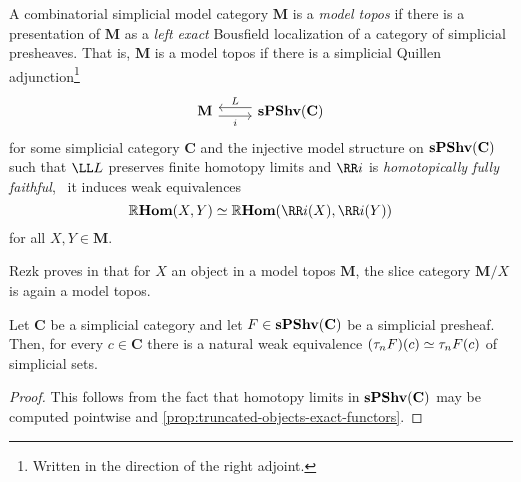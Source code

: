 \begin{definition}\label{defn:model-topos}
  A combinatorial simplicial model category \(\mathbf M\) is a
  \emph{model topos} if there is a presentation of \(\mathbf M\) as a
  \emph{left exact} Bousfield localization of a category of simplicial
  presheaves. That is, \(\mathbf M\) is a model topos if there is a
  simplicial Quillen adjunction\footnote{Written in the direction of
    the right adjoint.}
  \[
  \begin{tikzcd}
    \mathbf M \arrow[r, shift right=.7ex, "i"'] & \arrow[l, shift right=.7ex, "L"'] \spshv(\mathbf C)
  \end{tikzcd}
  \]
  for some simplicial category \(\mathbf C\) and the injective model
  structure on \(\operatorname{\textnormal{\bfseries sPShv}}(\mathbf C)\) such that \(\LL L\) preserves
  finite homotopy limits and \(\RR i\) is \emph{homotopically fully
    faithful}, \ie~it induces weak equivalences
  \[
  \RHom(X, Y)\simeq\RHom(\RR i(X), \RR i(Y))
  \]
  for all \(X,Y\in\mathbf M\).
\end{definition}

Rezk proves in \cite[Corollary~6.10]{rezkhomotopytoposes} that for
\(X\) an object in a model topos \(\mathbf M\), the slice category
\(\mathbf M/X\) is again a model topos.

\begin{lemma}\label{lem:trunc-presheaves}
  Let \(\mathbf C\) be a simplicial category and let
  \(F\in\operatorname{\textnormal{\bfseries sPShv}}(\mathbf C)\) be a simplicial presheaf. Then, for every
  \(c\in\mathbf C\) there is a natural weak equivalence
  \((\tau_{n}F)(c)\simeq \tau_{n}F(c)\) of simplicial sets.
\end{lemma}
\begin{proof}
  This follows from the fact that homotopy limits in \(\operatorname{\textnormal{\bfseries sPShv}}(\mathbf
  C)\) may be computed pointwise and
  \autoref{prop:truncated-objects-exact-functors}.
\end{proof}

